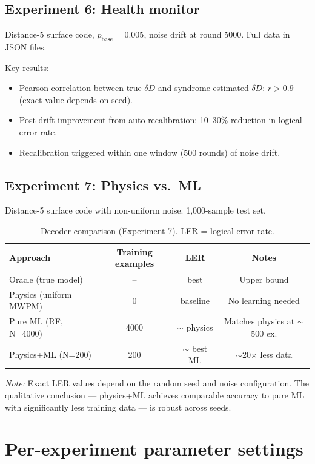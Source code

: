 \documentclass[12pt]{article}
\newcommand{\dd}{\delta\!D}
\begin{document}
\subsection{Experiment 6: Health monitor}

Distance-5 surface code, $p_{\text{base}} = 0.005$, noise drift at round 5000. Full data in JSON files.

Key results:
\begin{itemize}
  \item Pearson correlation between true $\dd$ and syndrome-estimated $\dd$: $r > 0.9$ (exact value depends on seed).
  \item Post-drift improvement from auto-recalibration: 10--30\% reduction in logical error rate.
  \item Recalibration triggered within one window (500 rounds) of noise drift.
\end{itemize}

\subsection{Experiment 7: Physics vs.\ ML}

Distance-5 surface code with non-uniform noise. 1,000-sample test set.

\begin{table}[h]
\centering
\caption{Decoder comparison (Experiment 7). LER = logical error rate.}
\begin{tabular}{lccc}
\toprule
Approach & Training examples & LER & Notes \\
\midrule
Oracle (true model) & -- & best & Upper bound \\
Physics (uniform MWPM) & 0 & baseline & No learning needed \\
Pure ML (RF, N=4000) & 4000 & $\sim$ physics & Matches physics at $\sim$500 ex. \\
Physics+ML (N=200) & 200 & $\sim$ best ML & $\sim$20$\times$ less data \\
\bottomrule
\end{tabular}
\end{table}

\emph{Note:} Exact LER values depend on the random seed and noise configuration. The qualitative conclusion --- physics+ML achieves comparable accuracy to pure ML with significantly less training data --- is robust across seeds.

\section{Per-experiment parameter settings}
\label{sec:params}
\end{document}
